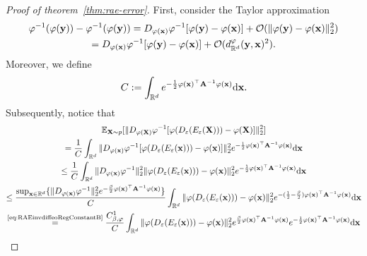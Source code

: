 \begin{proof}[Proof of theorem~\ref{thm:rae-error}]
First, consider the Taylor approximation
    \begin{multline}
        \varphi^{-1}(\varphi(\mathbf{y})) - \varphi^{-1}(\varphi(\mathbf{y})) = D_{\varphi(\mathbf{x})} \varphi^{-1} [\varphi(\mathbf{y}) - \varphi(\mathbf{x})]  + \mathcal{O}(\|\varphi(\mathbf{y}) - \varphi(\mathbf{x})\|_2^2) \\
        = D_{\varphi(\mathbf{x})} \varphi^{-1} [\varphi(\mathbf{y}) - \varphi(\mathbf{x})]  + \mathcal{O}(d_{\mathbb{R}^{d}}^\varphi(\mathbf{y},\mathbf{x})^2).
        \label{eq:thm-l2-bound-rae-taylor-phiinv-phi}
    \end{multline}
    Moreover, we define
    \begin{equation}
        C :=  \int_{\mathbb{R}^{d}} e^{-\frac{1}{2} \varphi(\mathbf{x})^\top \mathbf{A}^{-1} \varphi(\mathbf{x})} \mathrm{d} \mathbf{x}.
        \label{eq:RAEnormalizationConstant-2}
    \end{equation}
Subsequently, notice that
    \begin{multline}
        \mathbb{E}_{\stoVector \sim \density}[\|D_{\diffeo(\stoVector)} \diffeo^{-1} [\diffeo(D_\RAErelerror(E_\RAErelerror(\stoVector))) - \diffeo(\stoVector)]\|_2^2] \\
        = \frac{1}{\RAEnormalizationConstant}\int_{\Real^\dimInd} \|D_{\diffeo(\Vector)} \diffeo^{-1} [\diffeo(D_\RAErelerror(E_\RAErelerror(\Vector))) - \diffeo(\Vector)]\|_2^2 e^{-\frac{1}{2} \diffeo(\Vector)^\top \spdMatrix^{-1} \diffeo(\Vector)} \mathrm{d} \Vector\\
        \leq \frac{1}{\RAEnormalizationConstant} \int_{\Real^\dimInd} \|D_{\diffeo(\Vector)} \diffeo^{-1}\|_2^2\|\diffeo(D_\RAErelerror(E_\RAErelerror(\Vector))) - \diffeo(\Vector)\|_2^2 e^{-\frac{1}{2} \diffeo(\Vector)^\top \spdMatrix^{-1} \diffeo(\Vector)} \mathrm{d} \Vector \\
        \leq \frac{\sup_{\Vector\in \Real^{\dimInd}} \{ \| D_{\diffeo(\Vector)} \diffeo^{-1}\|_2^2 e^{-\frac{\RAEboundParam}{2} \diffeo(\Vector)^\top \spdMatrix^{-1} \diffeo(\Vector) } \}}{\RAEnormalizationConstant} \int_{\Real^\dimInd} \|\diffeo(D_\RAErelerror(E_\RAErelerror(\Vector))) - \diffeo(\Vector)\|_2^2 e^{-(\frac{1}{2} - \frac{\RAEboundParam}{2}) \diffeo(\Vector)^\top \spdMatrix^{-1} \diffeo(\Vector)} \mathrm{d} \Vector\\
        \overset{\text{\ref{eq:RAEinvdiffeoRegConstantB}}}{=} \frac{\RAEinvdiffeoRegConstantB}{\RAEnormalizationConstant} \int_{\Real^\dimInd} \|\diffeo(D_\RAErelerror(E_\RAErelerror(\Vector))) - \diffeo(\Vector)\|_2^2 e^{\frac{\RAEboundParam}{2} \diffeo(\Vector)^\top \spdMatrix^{-1} \diffeo(\Vector)} e^{-\frac{1}{2}\diffeo(\Vector)^\top \spdMatrix^{-1} \diffeo(\Vector)} \mathrm{d} \Vector\\

\end{multline}
\end{proof}
